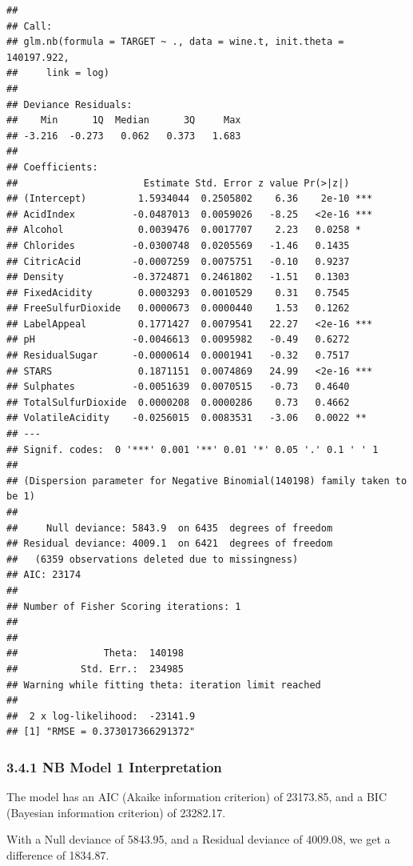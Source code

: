\documentclass[]{article}
\begin{document}
\begin{verbatim}
## 
## Call:
## glm.nb(formula = TARGET ~ ., data = wine.t, init.theta = 140197.922, 
##     link = log)
## 
## Deviance Residuals: 
##    Min      1Q  Median      3Q     Max  
## -3.216  -0.273   0.062   0.373   1.683  
## 
## Coefficients:
##                      Estimate Std. Error z value Pr(>|z|)    
## (Intercept)         1.5934044  0.2505802    6.36    2e-10 ***
## AcidIndex          -0.0487013  0.0059026   -8.25   <2e-16 ***
## Alcohol             0.0039476  0.0017707    2.23   0.0258 *  
## Chlorides          -0.0300748  0.0205569   -1.46   0.1435    
## CitricAcid         -0.0007259  0.0075751   -0.10   0.9237    
## Density            -0.3724871  0.2461802   -1.51   0.1303    
## FixedAcidity        0.0003293  0.0010529    0.31   0.7545    
## FreeSulfurDioxide   0.0000673  0.0000440    1.53   0.1262    
## LabelAppeal         0.1771427  0.0079541   22.27   <2e-16 ***
## pH                 -0.0046613  0.0095982   -0.49   0.6272    
## ResidualSugar      -0.0000614  0.0001941   -0.32   0.7517    
## STARS               0.1871151  0.0074869   24.99   <2e-16 ***
## Sulphates          -0.0051639  0.0070515   -0.73   0.4640    
## TotalSulfurDioxide  0.0000208  0.0000286    0.73   0.4662    
## VolatileAcidity    -0.0256015  0.0083531   -3.06   0.0022 ** 
## ---
## Signif. codes:  0 '***' 0.001 '**' 0.01 '*' 0.05 '.' 0.1 ' ' 1
## 
## (Dispersion parameter for Negative Binomial(140198) family taken to be 1)
## 
##     Null deviance: 5843.9  on 6435  degrees of freedom
## Residual deviance: 4009.1  on 6421  degrees of freedom
##   (6359 observations deleted due to missingness)
## AIC: 23174
## 
## Number of Fisher Scoring iterations: 1
## 
## 
##               Theta:  140198 
##           Std. Err.:  234985 
## Warning while fitting theta: iteration limit reached 
## 
##  2 x log-likelihood:  -23141.9
## [1] "RMSE = 0.373017366291372"
\end{verbatim}

\hypertarget{nb-model-1-interpretation}{%
\subsubsection{3.4.1 NB Model 1
Interpretation}\label{nb-model-1-interpretation}}

The model has an AIC (Akaike information criterion) of 23173.85, and a
BIC (Bayesian information criterion) of 23282.17.

With a Null deviance of 5843.95, and a Residual deviance of 4009.08, we
get a difference of 1834.87.
\end{document}
